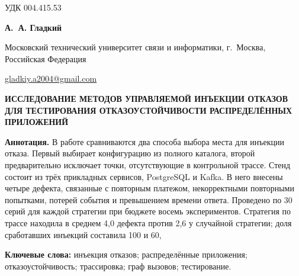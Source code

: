 \documentclass[10pt,a4paper]{article}
\begin{document}
\noindent УДК 004.415.53

\begin{center}
  {\bfseries А. А. Гладкий}\par
  Московский технический университет связи и информатики, г. Москва, Российская Федерация\par
  \href{mailto:gladkiy.a2004@gmail.com}{gladkiy.a2004@gmail.com}

  \vspace{0.8em}
  {\bfseries\MakeUppercase{Исследование методов управляемой инъекции отказов для тестирования отказоустойчивости распределённых приложений}}
\end{center}

\noindent\textbf{Аннотация.}
В работе сравниваются два способа выбора места для инъекции отказа. Первый выбирает конфигурацию из полного каталога, второй предварительно исключает точки, отсутствующие в контрольной трассе. Стенд состоит из трёх прикладных сервисов, PostgreSQL и Kafka. В него внесены четыре дефекта, связанные с повторным платежом, некорректными повторными попытками, потерей события и превышением времени ответа. Проведено по 30 серий для каждой стратегии при бюджете восемь экспериментов. Стратегия по трассе находила в среднем 4,0 дефекта против 2,6 у случайной стратегии; доля сработавших инъекций составила 100 и 60,%

\noindent\textbf{Ключевые слова:}
инъекция отказов; распределённые приложения; отказоустойчивость; трассировка; граф вызовов; тестирование.
\end{document}
